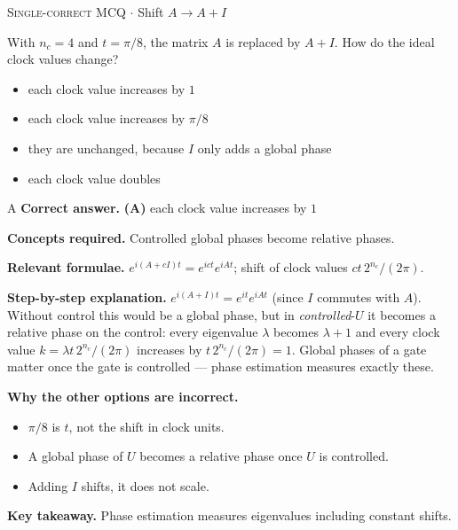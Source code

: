 \documentclass[11pt,a4paper]{article}
\newcommand{\optlabel}[1]{\textbf{(#1)}}
\newcommand{\correctlabel}[1]{\textcolor{okgreen}{\textbf{(#1)}\,\ding{51}}}
\newenvironment{qitem}[1]{\begin{list}{}{\setlength{\leftmargin}{3.3em}\setlength{\labelwidth}{3.1em}%
  \setlength{\labelsep}{0.2em}\setlength{\topsep}{3pt}\setlength{\parsep}{3pt}}\item[\textbf{Q.#1}\hfill]}{\end{list}}
\newcommand{\qsep}{\par\vspace{2pt}{\color{black!15}\hrule}\vspace{4pt}}
\newcommand{\qmeta}[2]{{\footnotesize\color{black!60}\textsc{#1} \;$\cdot$\; #2}\par}
\begin{document}
\begin{qitem}{40}
\qmeta{Single-correct MCQ}{Shift $A \to A + I$}
With $n_c = 4$ and $t = \pi/8$, the matrix $A$ is replaced by $A + I$. How do the ideal clock values change?
\begin{itemize}[leftmargin=2.6em, labelsep=0.4em, itemsep=2pt, topsep=3pt]
\item[\correctlabel{A}] each clock value increases by $1$
\item[\optlabel{B}] each clock value increases by $\pi/8$
\item[\optlabel{C}] they are unchanged, because $I$ only adds a global phase
\item[\optlabel{D}] each clock value doubles
\end{itemize}
\end{qitem}
\begin{solbox}{A}
\textbf{\color{brand}Correct answer.} \textcolor{okgreen}{\textbf{(A)}} each clock value increases by $1$

\textbf{\color{brand}Concepts required.} Controlled global phases become relative phases.

\textbf{\color{brand}Relevant formulae.} $e^{i(A + cI)t} = e^{ict}e^{iAt}$; shift of clock values $ct\,2^{n_c}/(2\pi)$.

\textbf{\color{brand}Step-by-step explanation.} $e^{i(A + I)t} = e^{it}e^{iAt}$ (since $I$ commutes with $A$). Without control this would be a global phase, but in \emph{controlled}-$U$ it becomes a relative phase on the control: every eigenvalue
$\lambda$ becomes $\lambda + 1$ and every clock value $k = \lambda t\,2^{n_c}/(2\pi)$ increases by $t\,2^{n_c}/(2\pi) = 1$. Global phases of a gate matter once the gate is controlled ---
phase estimation measures exactly these.

\textbf{\color{brand}Why the other options are incorrect.}
\begin{itemize}[leftmargin=2.4em, itemsep=1pt, topsep=2pt]
\item[\textbf{(B)}] $\pi/8$ is $t$, not the shift in clock units.
\item[\textbf{(C)}] A global phase of $U$ becomes a relative phase once $U$ is controlled.
\item[\textbf{(D)}] Adding $I$ shifts, it does not scale.
\end{itemize}
\textbf{\color{brand}Key takeaway.} Phase estimation measures eigenvalues including constant shifts.
\end{solbox}
\qsep
\end{document}
